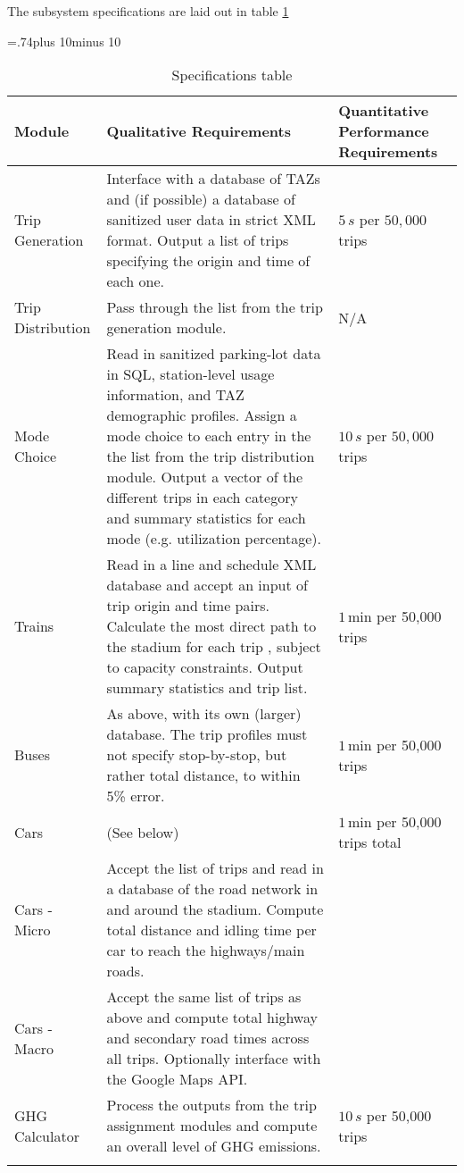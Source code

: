 \documentclass[12pt]{article}
\begin{document}
The subsystem specifications are laid out in table \ref{specs}
\begin{table}[htp]
  \newlength\midcolumnwidth
  \midcolumnwidth=.74\textwidth plus 10\tabcolsep minus 10\tabcolsep
  \centering
  \caption{Specifications table}
  \label{specs}
  \begin{tabular}{%
    >{\raggedright}p{}%
    p{\midcolumnwidth}%
    >{\raggedright\arraybackslash}p{}}
  \firsthline
  \bfseries Module & \bfseries Qualitative Requirements & \bfseries
  Quantitative Performance Requirements \\ \hline
  Trip Generation & Interface with a database of TAZs and (if
  possible) a database of sanitized user data in strict XML format.
  Output a list of trips specifying the origin and time of each one. &
  $5\,s$ per $50,000$ trips \\
  Trip Distribution & Pass through the list from the trip generation
  module. & N/A \\
  Mode Choice & Read in sanitized parking-lot data in SQL,
  station-level usage information, and TAZ demographic profiles.
  Assign a mode choice to each entry in the the list from the trip
  distribution module.
  Output a vector of the different trips in each category and
  summary statistics for each mode (e.g. utilization percentage). &
  $10\, s$ per $50,000$ trips \\
  Trains & Read in a line and schedule XML database
  and accept an input of trip origin and time pairs. Calculate the
  most direct path to the stadium for each trip , subject to capacity
  constraints. Output summary statistics and trip list. & $1\,$min
  per 50,000 trips \\
  Buses & As above, with its own (larger) database. The trip profiles
  must not specify stop-by-stop, but rather total distance, to
  within 5\% error. & $1\,$min per 50,000 trips \\
  Cars & (See below) & $1\,$min per 50,000 trips total \\
  Cars - Micro & Accept the list of trips and read in a database of
  the road network in and around the stadium. Compute total distance
  and idling time per car to reach the highways/main roads. & \\
  Cars - Macro & Accept the same list of trips as above and compute
  total highway and secondary road times across all trips. Optionally
  interface with the Google Maps API. & \\
  GHG Calculator & Process the outputs from the trip assignment
  modules and compute an overall level of GHG emissions. & $10\,s$
  per 50,000 trips \\
  \lasthline
  \end{tabular}
\end{table}
\end{document}
